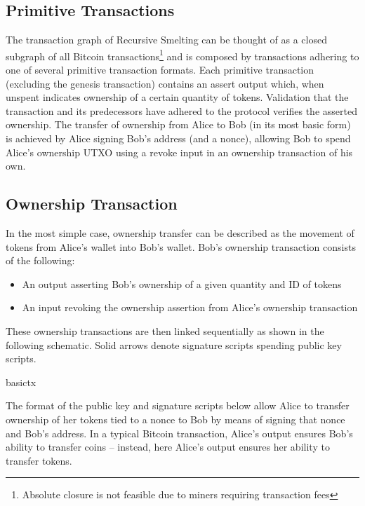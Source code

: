 \documentclass[9pt,oneside]{amsart}
\begin{document}
\begin{multicols}{2}
\section{Primitive Transactions}\label{sec:primtrans}
The transaction graph of Recursive Smelting can be thought of as a closed subgraph of all Bitcoin transactions\footnote{Absolute closure is not feasible due to miners requiring transaction fees} and is composed by transactions adhering to one of several primitive transaction formats. Each primitive transaction (excluding the genesis transaction) contains an assert output which, when unspent indicates ownership of a certain quantity of tokens.  Validation that the transaction and its predecessors have adhered to the protocol verifies the asserted ownership. The transfer of ownership from Alice to Bob (in its most basic form) is achieved by Alice signing Bob's address (and a nonce), allowing Bob to spend Alice's ownership UTXO using a revoke input in an ownership transaction of his own.

\subsection{Ownership Transaction}\label{subsec:basicownershiptx}
In the most simple case, ownership transfer can be described as the movement of tokens from Alice's wallet into Bob's wallet. Bob's ownership transaction consists of the following:
\begin{itemize}
    \item An output asserting Bob's ownership of a given quantity and ID of tokens
    \item An input revoking the ownership assertion from Alice's ownership transaction
\end{itemize}

These ownership transactions are then linked sequentially as shown in the following schematic. Solid arrows denote signature scripts spending public key scripts.
\begin{center}
{basictx}
\end{center}

The format of the public key and signature scripts below allow Alice to transfer ownership of her tokens tied to a nonce to Bob by means of signing that nonce and Bob's address. In a typical Bitcoin transaction, Alice's output ensures Bob's ability to transfer coins -- instead, here Alice's output ensures her ability to transfer tokens.



\end{multicols}
\end{document}
